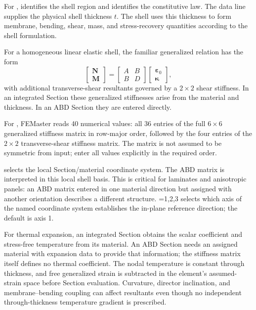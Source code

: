 For ,  identifies the shell region and  identifies the constitutive law. The data line supplies the physical shell thickness \(t\). The shell uses this thickness to form membrane, bending, shear, mass, and stress-recovery quantities according to the shell formulation.

For a homogeneous linear elastic shell, the familiar generalized relation has the form
\[
\begin{bmatrix}
\boldsymbol N\\
\boldsymbol M
\end{bmatrix}
=
\begin{bmatrix}
A & B\\
B & D
\end{bmatrix}
\begin{bmatrix}
\boldsymbol\varepsilon_0\\
\boldsymbol\kappa
\end{bmatrix},
\]
with additional transverse-shear resultants governed by a \(2\times2\) shear stiffness. In an integrated Section these generalized stiffnesses arise from the material and thickness. In an ABD Section they are entered directly.

For , FEMaster reads 40 numerical values: all 36 entries of the full \(6\times6\) generalized stiffness matrix in row-major order, followed by the four entries of the \(2\times2\) transverse-shear stiffness matrix. The matrix is not assumed to be symmetric from input; enter all values explicitly in the required order.

 selects the local Section/material coordinate system. The ABD matrix is interpreted in this local shell basis. This is critical for laminates and anisotropic panels: an ABD matrix entered in one material direction but assigned with another orientation describes a different structure. =1,2,3 selects which axis of the named coordinate system establishes the in-plane reference direction; the default is axis 1.

For thermal expansion, an integrated Section obtains the scalar coefficient and stress-free temperature from its material. An ABD Section needs an assigned material with expansion data to provide that information; the stiffness matrix itself defines no thermal coefficient. The nodal temperature is constant through thickness, and free generalized strain is subtracted in the element's assumed-strain space before Section evaluation. Curvature, director inclination, and membrane--bending coupling can affect resultants even though no independent through-thickness temperature gradient is prescribed.

